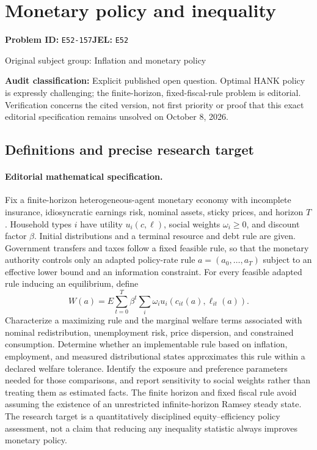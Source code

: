 \documentclass[11pt,a4paper]{article}
\begin{document}
\section*{Monetary policy and inequality}
\textbf{Problem ID:} \texttt{E52-157}\quad \textbf{JEL:} \texttt{E52}\par
\label{problem:OP-0249}
{\sffamily\small\color{muted}Original subject group: Inflation and monetary policy\par}
\label{definitions:problem:30007530}
\textbf{Audit classification:} Explicit published open question. Optimal HANK policy is expressly challenging; the finite-horizon, fixed-fiscal-rule problem is editorial. Verification concerns the cited version, not first priority or proof that this exact editorial specification remains unsolved on October 8, 2026.
\subsection*{Definitions and precise research target}
\paragraph{Editorial mathematical specification.} Fix a finite-horizon heterogeneous-agent monetary economy with incomplete insurance, idiosyncratic earnings risk, nominal assets, sticky prices, and horizon \(T\). Household types \(i\) have utility \(u_i(c,\ell)\), social weights \(\omega_i\ge0\), and discount factor \(\beta\). Initial distributions and a terminal resource and debt rule are given. Government transfers and taxes follow a fixed feasible rule, so that the monetary authority controls only an adapted policy-rate rule \(a=(a_0,\ldots,a_T)\) subject to an effective lower bound and an information constraint.
For every feasible adapted rule inducing an equilibrium, define
\[
W(a)=E\sum_{t=0}^T\beta^t\sum_i\omega_i u_i(c_{it}(a),\ell_{it}(a)).
\]
Characterize a maximizing rule and the marginal welfare terms associated with nominal redistribution, unemployment risk, price dispersion, and constrained consumption. Determine whether an implementable rule based on inflation, employment, and measured distributional states approximates this rule within a declared welfare tolerance. Identify the exposure and preference parameters needed for those comparisons, and report sensitivity to social weights rather than treating them as estimated facts. The finite horizon and fixed fiscal rule avoid assuming the existence of an unrestricted infinite-horizon Ramsey steady state. The research target is a quantitatively disciplined equity–efficiency policy assessment, not a claim that reducing any inequality statistic always improves monetary policy.
\end{document}
